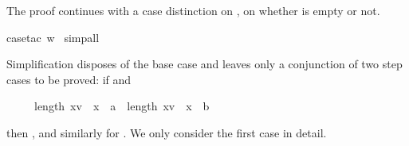\begin{isabellebody}
\begin{isamarkuptxt}
The proof continues with a case distinction on ,
on whether  is empty or not.%
\end{isamarkuptxt}%
case{\isacharunderscore}tac\ w{\isacharparenright}\isanewline
\ simp{\isacharunderscore}all{\isacharparenright}%
\begin{isamarkuptxt}%
\noindent
Simplification disposes of the base case and leaves only a conjunction
of two step cases to be proved:
if  and \begin{isabelle}%
\ \ \ \ \ length\ {\isacharbrackleft}x{\isasymin}v\ {\isachardot}\ x\ {\isacharequal}\ a{\isacharbrackright}\ {\isacharequal}\ length\ {\isacharbrackleft}x{\isasymin}v\ {\isachardot}\ x\ {\isacharequal}\ b{\isacharbrackright}\ {\isacharplus}\ {}%
\end{isabelle} then
, and similarly for .
We only consider the first case in detail.


\end{isamarkuptxt}
\end{isabellebody}
